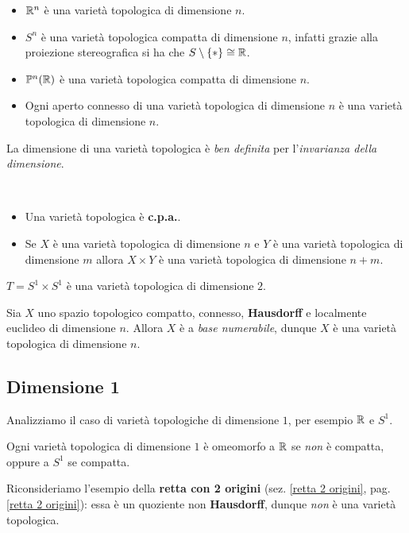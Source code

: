 \begin{examples}
	\begin{itemize}
		\item $\mathbb{R}^n$ è una varietà topologica di dimensione $n$.
		\item $S^n$ è una varietà topologica compatta di dimensione $n$, infatti grazie alla proiezione stereografica si ha che $S\setminus\{*\}\cong \mathbb{R}$.
		\item $\mathbb{P}^n(\mathbb{R})$ è una varietà topologica compatta di dimensione $n$.
		\item Ogni aperto connesso di una varietà topologica di dimensione $n$ è una varietà topologica di dimensione $n$.
	\end{itemize}
\vspace{-3mm}
\end{examples}
\begin{observe}
	La dimensione di una varietà topologica è \textit{ben definita} per l'\textit{invarianza della dimensione}.
\end{observe}
\begin{observes}~{}
	\begin{itemize}
		\item Una varietà topologica è \textbf{c.p.a.}.
		\item Se $X$ è una varietà topologica di dimensione $n$ e $Y$ è una varietà topologica di dimensione $m$ allora $X\times Y$ è una varietà topologica di dimensione $n+m$.
		\vspace{-3mm}
	\end{itemize}
\end{observes}
\begin{example}
	$T=S^1\times S^1$ è una varietà topologica di dimensione $2$.
\end{example}

\begin{theorema}\label{compattoconnessohausdorfflocalmenteuclideo}
	Sia $X$ uno spazio topologico compatto, connesso, \textbf{Hausdorff} e localmente euclideo di dimensione $n$. Allora $X$ è a \textit{base numerabile}, dunque $X$ è una varietà topologica di dimensione $n$.
\end{theorema}
 
\subsection{Dimensione 1}
Analizziamo il caso di varietà topologiche di dimensione $1$, per esempio $\mathbb{R}$ e $S^1$.
\begin{theorema}
	Ogni varietà topologica di dimensione $1$ è omeomorfo a $\mathbb{R}$ se \textit{non} è compatta, oppure a $S^1$ se compatta.
\end{theorema}
\begin{example} 
Riconsideriamo l'esempio della \textbf{retta con 2 origini} (sez. \ref{retta 2 origini}, pag. \ref{retta 2 origini}): essa è un quoziente non \textbf{Hausdorff}, dunque \textit{non} è una varietà topologica.
\end{example}
